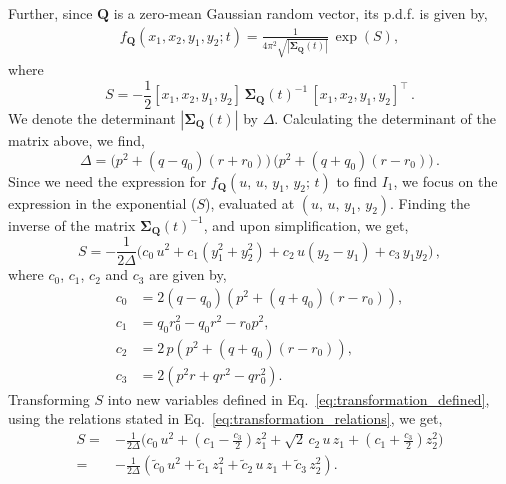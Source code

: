 \documentclass[journal]{IEEEtran}
\theoremstyle{plain}
\theoremstyle{definition}
\theoremstyle{remark}
\begin{document}
Further, since $\mathbf{Q}$ is a zero-mean Gaussian random vector, its p.d.f. is given by,
\begin{equation}
\begin{split}
    f_{\mathbf{Q}}(x_1, x_2, y_1, y_2; t) = \frac{1}{4\pi^2\sqrt{
    \left|\boldsymbol{\Sigma}_{\mathbf{Q}}(t)\right|}} \,\exp\left(S\right),
\end{split}
\end{equation}
where
\begin{equation}
    S = - \frac{1}{2}[x_1,x_2,y_1,y_2]\, {\boldsymbol{\Sigma}_{\mathbf{Q}}(t)}^{-1}\, [x_1,x_2,y_1,y_2]^\top \,.
\end{equation}
We denote the determinant $\left|\boldsymbol{\Sigma}_{\mathbf{Q}}(t)\right|$ by $\Delta$. Calculating the determinant of the matrix above, we find,
\begin{equation}
    \Delta = \bigl(p^2 + (q-q_0) (r+r_0)\bigr)\, \bigl(p^2 + (q+q_0) (r-r_0)\bigr) \,.\label{eq:determinant_expr}
\end{equation}
Since we need the expression for $f_{\mathbf{Q}}(u, \,u, \,y_1, \,y_2; \, t)$ to find $I_1$, we focus on the expression in the exponential ($S$), evaluated at $\left(u, \,u, \, y_1,\,y_2\right)$. Finding the inverse of the matrix ${\boldsymbol{\Sigma}_{\mathbf{Q}}(t)}^{-1}$, and upon simplification, we get,
\begin{equation}
    S = -\frac{1}{2\Delta} \bigl(c_0 \, u^2  + c_1  \left(y_1^2 + y_2^2\right) + c_2 \, u \left(y_2-y_1\right) + c_3 \, y_1y_2 \bigr)\,,
\end{equation}
where $c_0$, $c_1$, $c_2$ and $c_3$ are given by,
\begin{equation}
\begin{split}
    c_0 &= 2 \left(q - q_0\right) \left(p^2 + \left(q + q_0\right) \left(r - r_0\right)\right) , \\
    c_1 &=  q_0 r_0^2 - q_0 r^2 - r_0 p^2 , \\
    c_2 &= 2\, p \left(p^2 + \left(q + q_0\right) \left(r - r_0\right)\right) , \\
    c_3 &= 2 \left(p^2 r+q r^2-q r_0^2\right) .
\end{split}
\end{equation}
Transforming $S$ into new variables defined in Eq.~\eqref{eq:transformation_defined}, using the relations stated in Eq.~\eqref{eq:transformation_relations}, we get,
\begin{equation}
\begin{split}
    S =& -\frac{1}{2\Delta} \biggl(c_0 \, u^2  + \left(c_1-\frac{c_3}{2}\right) z_1^2 +  \sqrt{2} \,c_2 \, u \,z_1
     + \left(c_1 + \frac{c_3}{2}\right) z_2^2  \biggr) \\
    =& -\frac{1}{2\Delta} \left(\tilde{c}_0 \, u^2  + \tilde{c}_1\, z_1^2 +  \tilde{c}_2\, u \,z_1 + \tilde{c}_3 \,z_2^2  \right).
\end{split}
\end{equation}
\end{document}
